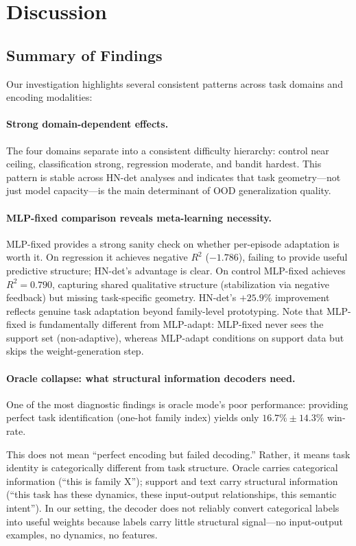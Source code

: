 \section{Discussion}\label{sec:discussion}

\subsection{Summary of Findings}

Our investigation highlights several consistent patterns across task domains and encoding modalities:

\paragraph{Strong domain-dependent effects.}
The four domains separate into a consistent difficulty hierarchy: control near ceiling,
classification strong, regression moderate, and bandit hardest.
This pattern is stable across HN-det analyses and indicates that task
geometry---not just model capacity---is the main determinant of OOD generalization quality.

\paragraph{MLP-fixed comparison reveals meta-learning necessity.}
MLP-fixed provides a strong sanity check on whether per-episode adaptation is worth it.
On regression it achieves negative $R^2$ ($-1.786$), failing to provide useful predictive structure; HN-det's advantage is clear.
On control MLP-fixed achieves $R^2 = 0.790$, capturing shared qualitative structure (stabilization via negative feedback) but missing task-specific geometry.
HN-det's $+25.9\%$ improvement reflects genuine task adaptation beyond family-level prototyping.
Note that MLP-fixed is fundamentally different from MLP-adapt: MLP-fixed never sees the support set (non-adaptive), whereas MLP-adapt conditions on support data but skips the weight-generation step.

\paragraph{Oracle collapse: what structural information decoders need.}
One of the most diagnostic findings is oracle mode's poor performance: providing perfect task identification (one-hot family index) yields only $16.7\%\pm14.3\%$ win-rate.

This does not mean ``perfect encoding but failed decoding.''
Rather, it means task identity is categorically different from task structure.
Oracle carries categorical information (``this is family X''); support and text carry structural information (``this task has these dynamics, these input-output relationships, this semantic intent'').
In our setting, the decoder does not reliably convert categorical labels into useful weights because labels carry little structural signal---no input-output examples, no dynamics, no features.

